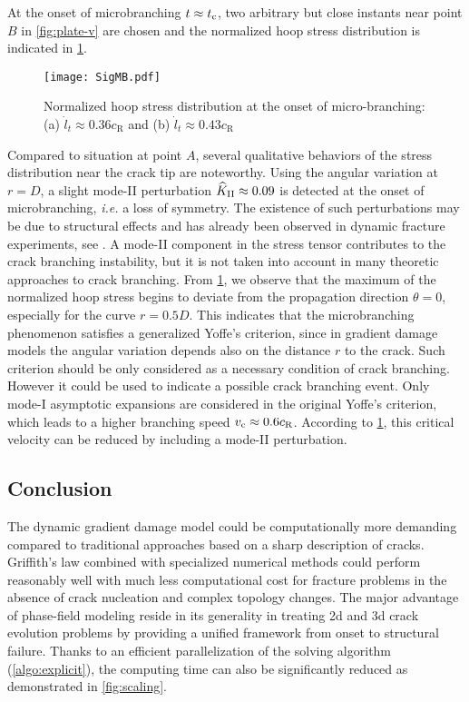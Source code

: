 At the onset of microbranching $t\approx t_{\mathrm{c}}$, two arbitrary but close instants near point $B$ in \cref{fig:plate-v} are chosen and the normalized hoop stress distribution is indicated in \cref{fig:SigMB}.
\begin{figure}[htbp]
\centering
\texttt{[image: SigMB.pdf]}
\caption{Normalized hoop stress distribution at the onset of micro-branching: (a) $\dot{l}_t\approx 0.36c_\mathrm{R}$ and (b) $\dot{l}_t\approx 0.43c_\mathrm{R}$} \label{fig:SigMB}
\end{figure}
Compared to situation at point $A$, several qualitative behaviors of the stress distribution near the crack tip are noteworthy. Using the angular variation at $r=D$, a slight mode-II perturbation $\widehat{K}_\RNN{2}\approx 0.09$ is detected at the onset of microbranching, \emph{i.e.} a loss of symmetry. The existence of such perturbations may be due to structural effects and has already been observed in dynamic fracture experiments, see \cite{BoueCohenFineberg:2015}. A mode-II component in the stress tensor contributes to the crack branching instability, but it is not taken into account in many theoretic approaches to crack branching. From \cref{fig:SigMB}, we observe that the maximum of the normalized hoop stress begins to deviate from the propagation direction $\theta=0$, especially for the curve $r=0.5D$. This indicates that the microbranching phenomenon satisfies a generalized Yoffe's criterion, since in gradient damage models the angular variation depends also on the distance $r$ to the crack. Such criterion should be only considered as a necessary condition of crack branching. However it could be used to indicate a possible crack branching event. Only mode-I asymptotic expansions are considered in the original Yoffe's criterion, which leads to a higher branching speed $v_{\mathrm{c}}\approx 0.6c_\mathrm{R}$. According to \cref{fig:SigMB}, this critical velocity can be reduced by including a mode-II perturbation.

\subsection*{Conclusion}
The dynamic gradient damage model could be computationally more demanding compared to traditional approaches based on a sharp description of cracks. Griffith's law combined with specialized numerical methods could perform reasonably well with much less computational cost for fracture problems in the absence of crack nucleation and complex topology changes. The major advantage of phase-field modeling reside in its generality in treating 2d and 3d crack evolution problems by providing a unified framework from onset to structural failure. Thanks to an efficient parallelization of the solving algorithm (\cref{algo:explicit}), the computing time can also be significantly reduced as demonstrated in \cref{fig:scaling}.

